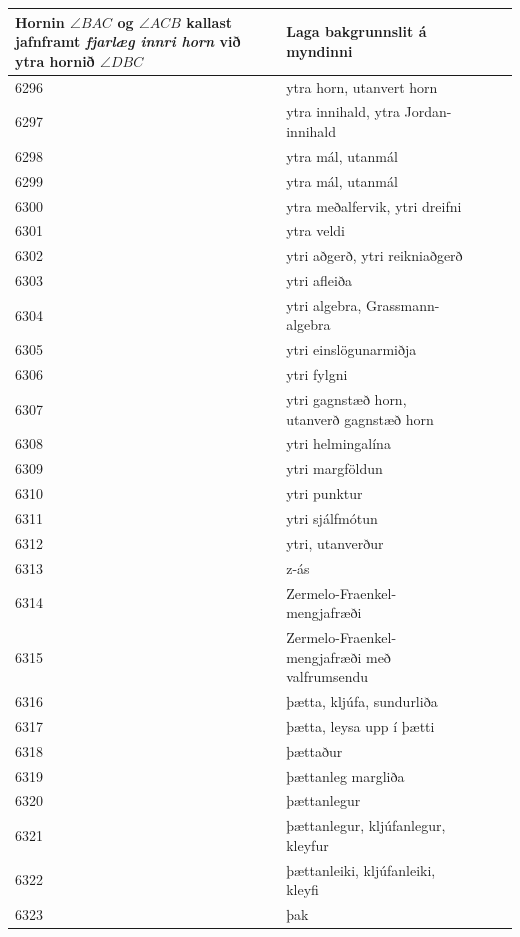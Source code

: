 \begin{longtable}{p{}|p{}|p{}|p{}|p{}}
Hornin $\angle BAC$ og $\angle ACB$ kallast jafnframt \textit{fjarlæg innri horn} við ytra hornið $\angle DBC$ & Laga bakgrunnslit á myndinni \\
\hline
6296 & ytra horn, utanvert horn &  &  &  \\
\hline
6297 & ytra innihald, ytra Jordan-innihald &  &  &  \\
\hline
6298 & ytra mál, utanmál &  &  &  \\
\hline
6299 & ytra mál, utanmál &  &  &  \\
\hline
6300 & ytra meðalfervik, ytri dreifni &  &  &  \\
\hline
6301 & ytra veldi &  &  &  \\
\hline
6302 & ytri aðgerð, ytri reikniaðgerð &  &  &  \\
\hline
6303 & ytri afleiða &  &  &  \\
\hline
6304 & ytri algebra, Grassmann-algebra &  &  &  \\
\hline
6305 & ytri einslögunarmiðja &  &  &  \\
\hline
6306 & ytri fylgni &  &  &  \\
\hline
6307 & ytri gagnstæð horn, utanverð gagnstæð horn &  &  &  \\
\hline
6308 & ytri helmingalína &  &  &  \\
\hline
6309 & ytri margföldun &  &  &  \\
\hline
6310 & ytri punktur &  &  &  \\
\hline
6311 & ytri sjálfmótun &  &  &  \\
\hline
6312 & ytri, utanverður &  &  &  \\
\hline
6313 & z-ás &  &  &  \\
\hline
6314 & Zermelo-Fraenkel-mengjafræði &  &  &  \\
\hline
6315 & Zermelo-Fraenkel-mengjafræði með valfrumsendu &  &  &  \\
\hline
6316 & þætta, kljúfa, sundurliða &  &  &  \\
\hline
6317 & þætta, leysa upp í þætti &  &  &  \\
\hline
6318 & þættaður &  &  &  \\
\hline
6319 & þættanleg margliða &  &  &  \\
\hline
6320 & þættanlegur &  &  &  \\
\hline
6321 & þættanlegur, kljúfanlegur, kleyfur &  &  &  \\
\hline
6322 & þættanleiki, kljúfanleiki, kleyfi &  &  &  \\
\hline
6323 & þak &  &  &  \\

\end{longtable}
